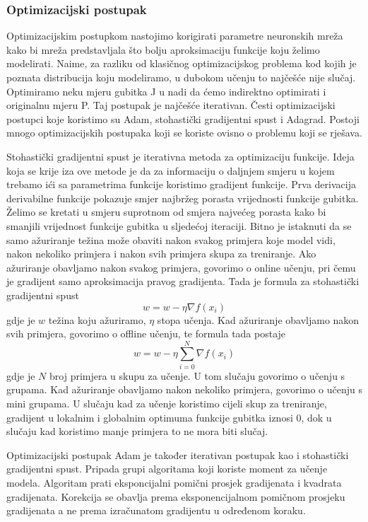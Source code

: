 \documentclass[times, utf8, diplomski,  numeric]{fer}
\begin{document}
\subsubsection{Optimizacijski postupak}
Optimizacijskim postupkom nastojimo korigirati parametre neuronskih mreža kako bi mreža predstavljala što bolju aproksimaciju funkcije koju želimo modelirati. Naime, za razliku od klasičnog optimizacijskog problema kod kojih je poznata distribucija koju modeliramo, u dubokom učenju to najčešće nije slučaj. Optimiramo neku mjeru gubitka J u nadi da ćemo indirektno optimirati i originalnu mjeru P. Taj postupak je najčešće iterativan. Česti optimizacijski postupci koje koristimo su Adam, stohastički gradijentni spust i Adagrad. Postoji mnogo optimizacijskih postupaka koji se koriste ovisno o problemu koji se rješava.
\par
Stohastički gradijentni spust je iterativna metoda za optimizaciju funkcije. Ideja koja se krije iza ove metode je da za informaciju o daljnjem smjeru u kojem trebamo ići sa parametrima funkcije koristimo gradijent funkcije. Prva derivacija derivabilne funkcije pokazuje smjer najbržeg porasta vrijednosti funkcije gubitka. Želimo se kretati u smjeru suprotnom od smjera najvećeg porasta kako bi smanjili vrijednost funkcije gubitka u sljedećoj iteraciji. Bitno je istaknuti da se samo ažuriranje težina može obaviti nakon svakog primjera koje model vidi, nakon nekoliko primjera i nakon svih primjera skupa za treniranje. Ako ažuriranje obavljamo nakon svakog primjera, govorimo o online učenju, pri čemu je gradijent samo aproksimacija pravog gradijenta. Tada je formula za stohastički gradijentni spust 
\begin{equation}
w = w - \eta \nabla f(x_{i})
\end{equation}
 gdje je $w$  težina koju ažuriramo, $\eta$ stopa učenja. Kad ažuriranje obavljamo nakon svih primjera, govorimo o offline učenju, te formula tada postaje
\begin{equation}
w = w - \eta \sum_{i=0}^{N} \nabla f(x_{i})
\end{equation}  gdje je $N$ broj primjera u skupu za učenje. U tom slučaju govorimo o učenju s grupama. Kad ažuriranje obavljamo nakon nekoliko primjera, govorimo o učenju s mini grupama. U slučaju kad za učenje koristimo cijeli skup za treniranje, gradijent u lokalnim i globalnim optimuma funkcije gubitka iznosi 0, dok u slučaju kad koristimo manje primjera to ne mora biti slučaj.
\par
Optimizacijski postupak Adam je također iterativan postupak kao i stohastički gradijentni spust. Pripada grupi algoritama koji koriste moment za učenje modela. Algoritam prati eksponcijalni pomični prosjek gradijenata i kvadrata gradijenata. Korekcija se obavlja prema eksponencijalnom pomičnom prosjeku gradijenata a ne prema izračunatom gradijentu u određenom koraku.
\end{document}
